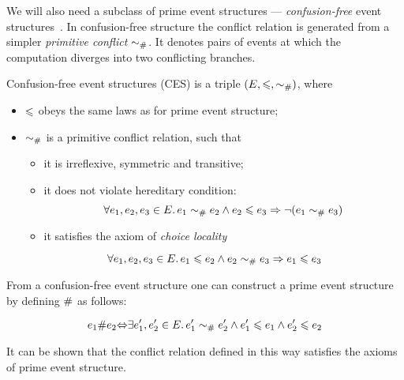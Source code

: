 We will also need a subclass of prime event structures --- 
\emph{confusion-free} event structures~\cite{Nielsen-al:1981}. 
In confusion-free structure the conflict relation is generated from 
a simpler \emph{primitive conflict} $\sim_{\#}$. 
It denotes pairs of events at which the computation
diverges into two conflicting branches. 

\begin{definition}
Confusion-free event structures (CES) is a triple $(E, \leqslant, \sim_{\#})$, where
\begin{itemize}
  \item $\leqslant$ obeys the same laws as for prime event structure;
  \item $\sim_{\#}$ is a primitive conflict relation, such that
  \begin{itemize}
    \item it is irreflexive, symmetric and transitive;
    \item it does not violate hereditary condition:
    $$ \forall e_1, e_2, e_3 \in E \ldotp 
       e_1 \sim_{\#} e_2 \land e_2 \leqslant e_3 \Rightarrow \neg (e_1 \sim_{\#} e_3) $$
    \item it satisfies the axiom of \emph{choice locality}
  \end{itemize}
    $$ \forall e_1, e_2, e_3 \in E \ldotp e_1 \leqslant e_2 \land e_2 \sim_{\#} e_3 \Rightarrow e_1 \leqslant e_3 $$
\end{itemize}
\end{definition}

From a confusion-free event structure one can construct a prime event structure
by defining $\#$ as follows:

$$ e_1 \# e_2 {\Leftrightarrow} 
   \exists e'_1, e'_2 \in E \ldotp e'_1 \sim_{\#} e'_2 \land
   e'_1 \leqslant e_1 \land e'_2 \leqslant e_2 $$

It can be shown that the conflict relation defined in this way 
satisfies the axioms of prime event structure.






